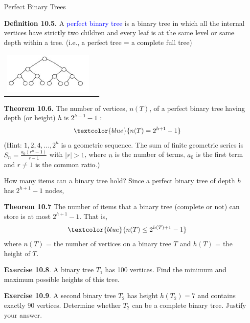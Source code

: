\documentclass[aspectratio=169]{beamer}
\providecommand{\Blue}[1]{\textcolor{blue}{#1}}
\begin{document}
 \begin{frame}[plain]{Perfect Binary Trees%
 }
 
 
 {\bf Definition 10.5.} A \Blue{perfect binary tree}  is a binary tree in which 
 all the internal vertices have strictly two children and every leaf  
 is at the same level or same depth within a tree. (i.e., a perfect tree = a complete full tree)
   
 \begin{center}
 \begin{tabular}{cc}
   \includegraphics[height=2cm]{./img/lecture10-fig3.jpg}
   \end{tabular}
 \end{center}
 
 {\bf Theorem 10.6.} The number of vertices, $n(T)$,
  of a perfect binary tree having depth (or height) $h$ is $2^{h+1}-1$ :
 \[ \Blue{n(T) = 2^{h+1}-1} \]
 (Hint: $1, 2, 4, ..., 2^h$ is a geometric sequence. The sum of finite geometric series is
 $S_n = \frac{a_0(r^n-1)}{r-1}$ with $|r|>1$, where $n$ is the number of terms, $a_0$
 is the first term and $r\neq 1$ is the common ratio.)
  
 \end{frame}

 
 \begin{frame}[plain]{}
 
 How many items can a binary tree hold? \pause 
  Since a perfect binary tree of depth $h$ has $2^{h+1}-1$ nodes,
  
 \smallskip
 
 {\bf Theorem 10.7}
    The number of items that a binary tree (complete or not) can store is at most $2^{h+1}-1$. That is,
  \[ \Blue{n(T) \leq 2^{h(T)+1}-1} \]
 where $n(T)$ = the number of vertices on a binary tree $T$ and $h(T)$ = the height of $T$.
 \pause
\medskip

{\bf Exercise 10.8}. A binary tree $T_1$ has 100 vertices. 
Find the minimum and maximum possible heights of this tree.
\medskip


{\bf Exercise 10.9}. A second binary tree $T_2$ has height $h(T_2)=7$
and contains exactly $90$ vertices. Determine whether $T_2$ can be a complete
binary tree. Justify your answer.

\end{frame}
\end{document}
